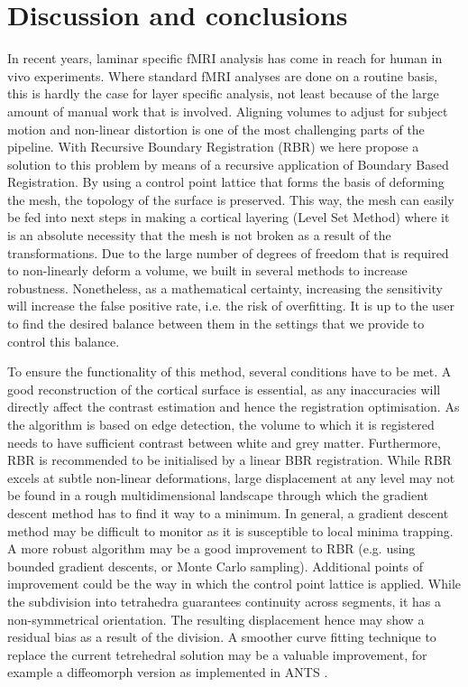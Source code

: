 \section{Discussion and conclusions}
In recent years, laminar specific fMRI analysis has come in reach for human in vivo experiments. Where standard fMRI analyses are done on a routine basis, this is hardly the case for layer specific analysis, not least because of the large amount of manual work that is involved. Aligning volumes to adjust for subject motion and non-linear distortion is one of the most challenging parts of the pipeline. With Recursive Boundary Registration (RBR) we here propose a solution to this problem by means of a recursive application of Boundary Based Registration. By using a control point lattice that forms the basis of deforming the mesh, the topology of the surface is preserved. This way, the mesh can easily be fed into next steps in making a cortical layering (Level Set Method) where it is an absolute necessity that the mesh is not broken as a result of the transformations. Due to the large number of degrees of freedom that is required to non-linearly deform a volume, we built in several methods to increase robustness. Nonetheless, as a mathematical certainty, increasing the sensitivity will increase the false positive rate, i.e. the risk of overfitting. It is up to the user to find the desired balance between them in the settings that we provide to control this balance. 

To ensure the functionality of this method, several conditions have to be met. A good reconstruction of the cortical surface is essential, as any inaccuracies will directly affect the contrast estimation and hence the registration optimisation. As the algorithm is based on edge detection, the volume to which it is registered needs to have sufficient contrast between white and grey matter. Furthermore, RBR is recommended to be initialised by a linear BBR registration. While RBR excels at subtle non-linear deformations, large displacement at any level may not be found in a rough multidimensional landscape through which the gradient descent method has to find it way to a minimum. In general, a gradient descent method may be difficult to monitor as it is susceptible to local minima trapping. A more robust algorithm may be a good improvement to RBR (e.g. using bounded gradient descents, or Monte Carlo sampling). Additional points of improvement could be the way in which the control point lattice is applied. While the subdivision into tetrahedra guarantees continuity across segments, it has a non-symmetrical orientation. The resulting displacement hence may show a residual bias as a result of the division. A smoother curve fitting technique to replace the current tetrehedral solution may be a valuable improvement, for example a diffeomorph version as implemented in ANTS \cite{Avants2011}. 

